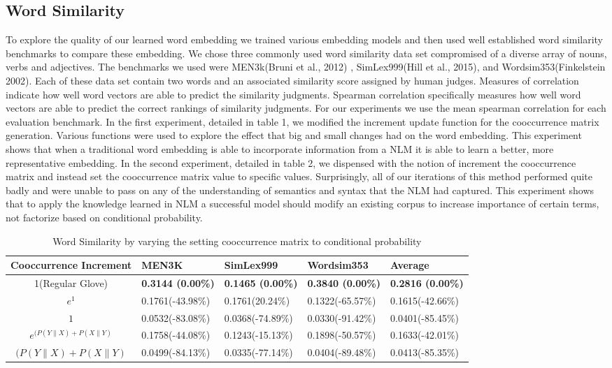 \documentclass[11pt]{article}
\begin{document}
\subsection{Word Similarity}
To explore the quality of our learned word embedding we trained various embedding models and then used well established word similarity benchmarks to compare these embedding. We chose three commonly used word similarity data set compromised of a diverse array of nouns, verbs and adjectives. The benchmarks we used were MEN3k(Bruni et al., 2012) , SimLex999(Hill et al., 2015), and Wordsim353(Finkelstein 2002). Each of these data set contain two words and an associated similarity score assigned by human judges. Measures of correlation indicate how well word vectors are able to predict the similarity judgments. Spearman correlation specifically measures how well word vectors are able to predict the correct rankings of similarity judgments. For our experiments we use the mean spearman correlation for each evaluation benchmark. 
In the first experiment, detailed in table 1, we modified the increment update function for the cooccurrence matrix generation. Various functions were used to explore the effect that big and small changes had on the word embedding. This experiment shows that when a traditional word embedding is able to incorporate information from a NLM it is able to learn a better, more representative embedding.
In the second experiment, detailed in table 2, we dispensed with the notion of increment the cooccurrence matrix and instead set the cooccurrence matrix value to specific values. Surprisingly, all of our iterations of this method performed quite badly and were unable to pass on any of the understanding of semantics and syntax that the NLM had captured. This experiment shows that to apply the knowledge learned in NLM a successful model should modify an existing corpus to increase importance of certain terms, not factorize based on conditional probability.
\begin{table*}[pt]
\centering
\caption{Word Similarity by varying the setting cooccurrence matrix to conditional probability}
\label{table2}
\begin{tabular}{|c|l|l|l|l|} \hline
Cooccurrence Increment & MEN3K & SimLex999 & Wordsim353 & Average\\ \hline
1(Regular Glove)  & \textbf{0.3144 (0.00\%) }& \textbf{0.1465 (0.00\%)} & \textbf{0.3840 (0.00\%) }& \textbf{0.2816  (0.00\%)}\\ \hline
$e^1 $ & 0.1761(-43.98\%) & 0.1761(20.24\%) & 0.1322(-65.57\%)& 0.1615(-42.66\%)\\ \hline
$ 1 $ & 0.0532(-83.08\%) & 0.0368(-74.89\%) & 0.0330(-91.42\%)& 0.0401(-85.45\%)\\ \hline
$e^{(P(Y\|X)+P(X\|Y)}$  & 0.1758(-44.08\%) & 0.1243(-15.13\%) &0.1898(-50.57\%)  &0.1633(-42.01\%) \\ \hline
$(P(Y\|X)+P(X\|Y)$  & 0.0499(-84.13\%) &0.0335(-77.14\%)  & 0.0404(-89.48\%) & 0.0413(-85.35\%)  \\ \hline
\end{tabular}
\end{table*}  
\end{document}
